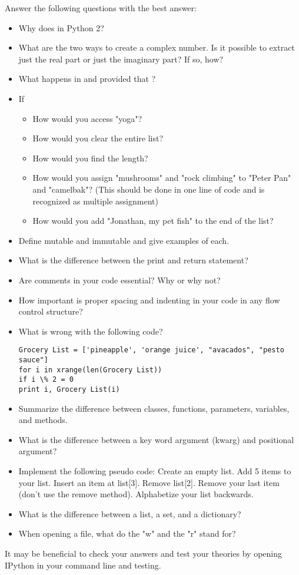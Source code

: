 \begin{problem}
Answer the following questions with the best answer:
\begin{itemize}
\item Why does  in Python 2? 
\item What are the two ways to create a complex number. Is it possible to extract just the real part or just the imaginary part? If so, how?
\item What happens in  and  provided that ?
\item If 
\begin{itemize}
	\item How would you access "yoga"? 
	\item How would you clear the entire list? 
	\item How would you find the length? 
	\item How would you assign "mushrooms" and "rock climbing" to "Peter Pan" and "camelbak"? (This should be done in one line of code and is recognized as multiple assignment)
	\item How would you add "Jonathan, my pet fish" to the end of the list?
\end{itemize}
\item Define mutable and immutable and give examples of each.
\item What is the difference between the print and return statement?
\item Are comments in your code essential? Why or why not?
\item How important is proper spacing and indenting in your code in any flow control structure?
\item What is wrong with the following code?
\begin{lstlisting}
Grocery List = ['pineapple', 'orange juice', "avacados", "pesto sauce"]
for i in xrange(len(Grocery List))
if i \% 2 = 0
print i, Grocery List(i)
\end{lstlisting}
\item Summarize the difference between classes, functions, parameters,  variables, and methods.
\item What is the difference between a key word argument (kwarg) and positional argument?
\item Implement the following pseudo code: Create an empty list. Add 5 items to your list. 
Insert an item at list[3]. Remove list[2]. 
Remove your last item (don't use the remove method). 
Alphabetize your list backwards. 
\item What is the difference between a list, a set, and a dictionary?
\item When opening a file, what do the "w" and the "r" stand for?
\end{itemize}
It may be beneficial to check your answers and test your theories by opening IPython in your command line and testing. 
\end{problem}

